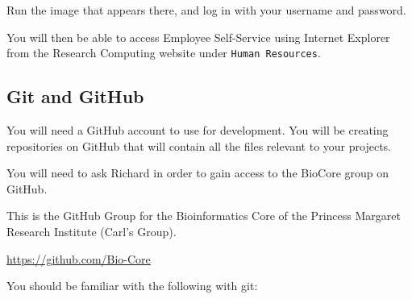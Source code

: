 \documentclass{article}
\begin{document}
Run the image that appears there, and log in with your
username and password.

You will then be able to access Employee Self-Service
using Internet Explorer from the Research Computing website
under \texttt{Human Resources}.

\subsection{Git and GitHub}

You will need a GitHub account to use for development.
You will be creating repositories on GitHub that will
contain all the files relevant to your projects.

You will need to ask Richard in order to gain access to 
the BioCore group on GitHub.

This is the GitHub Group for the Bioinformatics Core
of the Princess Margaret Research Institute (Carl's Group).

\url{https://github.com/Bio-Core}

You should be familiar with the following with git:
\end{document}
